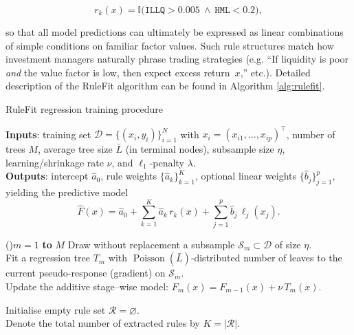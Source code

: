     \begin{equation}
        \label{eq:rulefit}
        r_{k}(x)=\mathbb{I}\bigl(\texttt{ILLQ}>0.005\ \wedge\ \texttt{HML}<0.2\bigr),
    \end{equation}
    
    so that all model predictions can ultimately be expressed as linear combinations of simple conditions on familiar factor values.  Such rule structures match how investment managers naturally phrase trading strategies (e.g. “If liquidity is poor \emph{and} the value factor is low, then expect excess return~$x$,” etc.). Detailed description of the RuleFit algorithm can be found in Algorithm \ref{alg:rulefit}.
    
    
    \begin{algorithm}[H]
        \caption{RuleFit regression training procedure }
        \label{alg:rulefit}
        
        \textbf{Inputs}: training set $\mathcal{D}=\{(x_i,y_i)\}_{i=1}^{N}$ with $x_i=(x_{i1},\dots,x_{ip})^\top$,  
        number of trees $M$, average tree size $\bar{L}$ (in terminal nodes),  
        subsample size $\eta$, learning/shrinkage rate $\nu$, and $\ell_{1}$‐penalty $\lambda$.  \\[2pt]
        \textbf{Outputs}: intercept $\hat{a}_0$, rule weights $\{\hat{a}_k\}_{k=1}^{K}$, optional linear weights $\{\hat{b}_j\}_{j=1}^{p}$,  
        yielding the predictive model  
        \[
          \widehat{F}(x)=\hat{a}_0+\sum_{k=1}^{K}\hat{a}_k\,r_k(x)+\sum_{j=1}^{p}\hat{b}_j\,\ell_j(x_j).
        \]
    
        \BlankLine
        \For(){$m=1$ {\bf to} $M$}{
            Draw without replacement a subsample $\mathcal{S}_m\subset\mathcal{D}$ of size $\eta$. \\
            Fit a regression tree $T_m$ with $\operatorname{Poisson}(\bar{L})$‐distributed number of leaves  
            to the current pseudo‐response (gradient) on $\mathcal{S}_m$. \\
            Update the additive stage–wise model: $F_{m}(x)=F_{m-1}(x)+\nu\,T_m(x)$.
        }
    
        \BlankLine
        Initialise empty rule set $\mathcal{R}=\varnothing$. \\
        Denote the total number of extracted rules by $K=|\mathcal{R}|$.
    

\end{algorithm}
